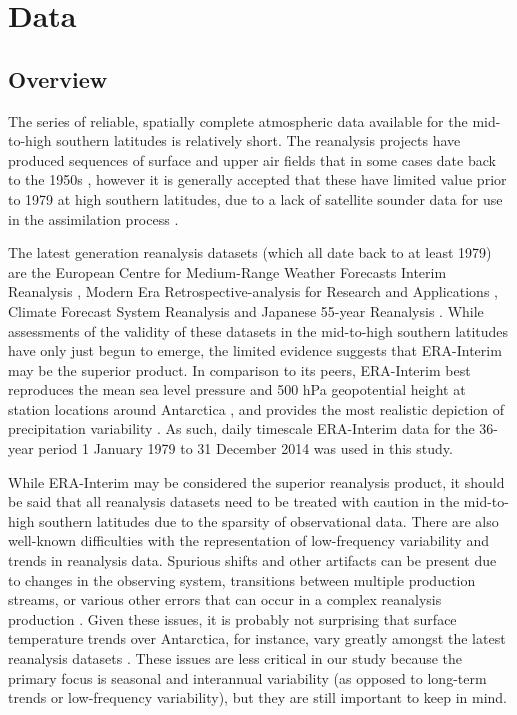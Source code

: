 \section{Data}\label{s:data}

\subsection{Overview}

The series of reliable, spatially complete atmospheric data available for the mid-to-high southern latitudes is relatively short. The reanalysis projects have produced sequences of surface and upper air fields that in some cases date back to the 1950s \citep{Kistler2001,Uppala2005,Kobayashi2015}, however it is generally accepted that these have limited value prior to 1979 at high southern latitudes, due to a lack of satellite sounder data for use in the assimilation process \citep{Hines2000}.

The latest generation reanalysis datasets (which all date back to at least 1979) are the European Centre for Medium-Range Weather Forecasts Interim Reanalysis \citep[ERA-Interim;][]{Dee2011}, Modern Era Retrospective-analysis for Research and Applications \citep[Merra;][]{Rienecker2011}, Climate Forecast System Reanalysis \citep[CFSR;][]{Saha2010} and Japanese 55-year Reanalysis \citep[JRA-55;][]{Kobayashi2015}. While assessments of the validity of these datasets in the mid-to-high southern latitudes have only just begun to emerge, the limited evidence suggests that ERA-Interim may be the superior product. In comparison to its peers, ERA-Interim best reproduces the mean sea level pressure and 500 hPa geopotential height at station locations around Antarctica \citep{Bracegirdle2012}, and provides the most realistic depiction of precipitation variability \citep{Bromwich2011,Nicolas2011}. As such, daily timescale ERA-Interim data for the 36-year period 1 January 1979 to 31 December 2014 was used in this study.

While ERA-Interim may be considered the superior reanalysis product, it should be said that all reanalysis datasets need to be treated with caution in the mid-to-high southern latitudes due to the sparsity of observational data. There are also well-known difficulties with the representation of low-frequency variability and trends in reanalysis data. Spurious shifts and other artifacts can be present due to changes in the observing system, transitions between multiple production streams, or various other errors that can occur in a complex reanalysis production \citep{Dee2014}. Given these issues, it is probably not surprising that surface temperature trends over Antarctica, for instance, vary greatly amongst the latest reanalysis datasets \citep{Nicolas2014}. These issues are less critical in our study because the primary focus is seasonal and interannual variability (as opposed to long-term trends or low-frequency variability), but they are still important to keep in mind.


